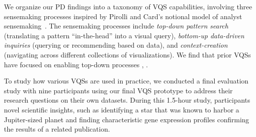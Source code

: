  \par We organize our PD findings into a taxonomy of VQS capabilities, involving three sensemaking processes inspired by Pirolli and Card's notional model of analyst sensemaking~\cite{Pirolli}. The sensemaking processes include \emph{top-down pattern search} (translating a pattern ``in-the-head'' into a visual query), \emph{bottom-up data-driven inquiries} (querying or recommending based on data), and \emph{context-creation} (navigating across different collections of visualizations). We find that prior VQSs have focused on enabling top-down processes , .
 \par To study how various VQSs are used in practice, we conducted a final evaluation study with nine participants using our final VQS prototype to address their research questions on their own datasets. During this 1.5-hour study, participants  novel scientific insights,
 such as identifying a star that was known to harbor a Jupiter-sized planet and finding characteristic gene expression profiles confirming the results of a related publication. %
